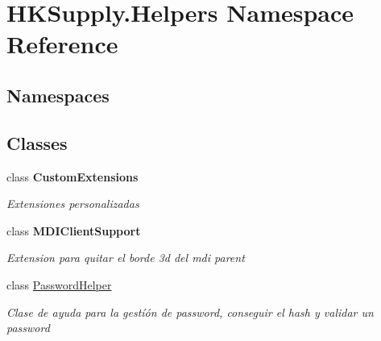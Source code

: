 \hypertarget{namespace_h_k_supply_1_1_helpers}{}\section{H\+K\+Supply.\+Helpers Namespace Reference}
\label{namespace_h_k_supply_1_1_helpers}
\subsection*{Namespaces}
\begin{DoxyCompactItemize}
\end{DoxyCompactItemize}
\subsection*{Classes}
\begin{DoxyCompactItemize}
\item 
class {\bfseries Custom\+Extensions}
\begin{DoxyCompactList}\small\item\em Extensiones personalizadas \end{DoxyCompactList}\item 
class {\bfseries M\+D\+I\+Client\+Support}
\begin{DoxyCompactList}\small\item\em Extension para quitar el borde 3d del mdi parent \end{DoxyCompactList}\item 
class \hyperlink{class_h_k_supply_1_1_helpers_1_1_password_helper}{Password\+Helper}
\begin{DoxyCompactList}\small\item\em Clase de ayuda para la gestíón de password, conseguir el hash y validar un password \end{DoxyCompactList}\end{DoxyCompactItemize}
